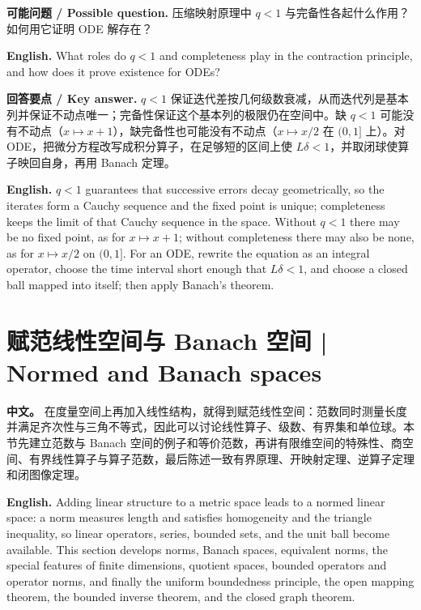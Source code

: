 \documentclass[UTF8,11pt,a4paper]{ctexart}
\newcommand{\EN}[1]{\par\noindent \textbf{English.} #1\par}
\newcommand{\ASK}[4]{\par\noindent \textbf{可能问题 / Possible question.} #1\par\EN{#2}\noindent \textbf{回答要点 / Key answer.} #3\par\EN{#4}\smallskip}
\newcommand{\APS}[2]{\par\noindent\textbf{中文。} #1\par\noindent\textbf{English.} #2\par\smallskip}
\begin{document}
\ASK{压缩映射原理中 $q<1$ 与完备性各起什么作用？如何用它证明 ODE 解存在？}{What roles do $q<1$ and completeness play in the contraction principle, and how does it prove existence for ODEs?}{$q<1$ 保证迭代差按几何级数衰减，从而迭代列是基本列并保证不动点唯一；完备性保证这个基本列的极限仍在空间中。缺 $q<1$ 可能没有不动点（$x\mapsto x+1$），缺完备性也可能没有不动点（$x\mapsto x/2$ 在 $(0,1]$ 上）。对 ODE，把微分方程改写成积分算子，在足够短的区间上使 $L\delta<1$，并取闭球使算子映回自身，再用 Banach 定理。}{$q<1$ guarantees that successive errors decay geometrically, so the iterates form a Cauchy sequence and the fixed point is unique; completeness keeps the limit of that Cauchy sequence in the space. Without $q<1$ there may be no fixed point, as for $x\mapsto x+1$; without completeness there may also be none, as for $x\mapsto x/2$ on $(0,1]$. For an ODE, rewrite the equation as an integral operator, choose the time interval short enough that $L\delta<1$, and choose a closed ball mapped into itself; then apply Banach's theorem.}

\section{赋范线性空间与 Banach 空间 | Normed and Banach spaces}
\APS{在度量空间上再加入线性结构，就得到赋范线性空间：范数同时测量长度并满足齐次性与三角不等式，因此可以讨论线性算子、级数、有界集和单位球。本节先建立范数与 Banach 空间的例子和等价范数，再讲有限维空间的特殊性、商空间、有界线性算子与算子范数，最后陈述一致有界原理、开映射定理、逆算子定理和闭图像定理。}{Adding linear structure to a metric space leads to a normed linear space: a norm measures length and satisfies homogeneity and the triangle inequality, so linear operators, series, bounded sets, and the unit ball become available. This section develops norms, Banach spaces, equivalent norms, the special features of finite dimensions, quotient spaces, bounded operators and operator norms, and finally the uniform boundedness principle, the open mapping theorem, the bounded inverse theorem, and the closed graph theorem.}
\end{document}
